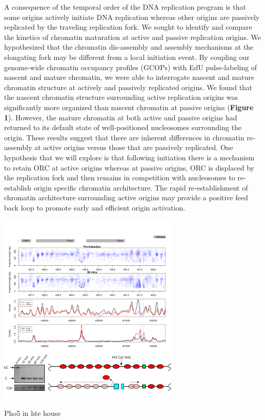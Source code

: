 A consequence of the temporal order of the DNA replication program is that some origins actively initiate DNA replication whereas other origins are passively replicated by the traveling replication fork.  We sought to identify and compare the kinetics of chromatin maturation at active and passive replication origins.  We hypothesized that the chromatin dis-assembly and assembly mechanisms at the elongating fork may be different from a local initiation event.  By coupling our genome-wide chromatin occupancy profiles (GCOPs) with EdU pulse-labeling of nascent and mature chromatin, we were able to interrogate nascent and mature chromatin structure at actively and passively replicated origins.  We found that the nascent chromatin structure surrounding active replication origins was significantly more organized than nascent chromatin at passive origins ({\color{dukeblue}\textbf{Figure 1}}).  However, the mature chromatin at both active and passive origins had returned to its default state of well-positioned nucleosomes surrounding the origin.  These results suggest that there are inherent differences in chromatin re-assembly at  active origins versus those that are passively replicated.  One hypothesis that we will explore is that following initiation there is a mechanism to retain ORC at active origins whereas at passive origins, ORC is displaced by the replication fork and then remains in competition with nucleosomes to re-establish origin specific chromatin architecture.  The rapid re-establishment of chromatin architecture surrounding active origins may provide a positive feed back loop to promote early and efficient origin activation. 
\begin{floatingfigure}[r]{3.4in}
\vspace{-15mm}
\begin{center}
\includegraphics[width=3.4in]{r35_figures/vinay_pho5.png}
\end{center}
\vspace{3mm}
\caption{Pho5 in hte house}%
\end{floatingfigure}%


